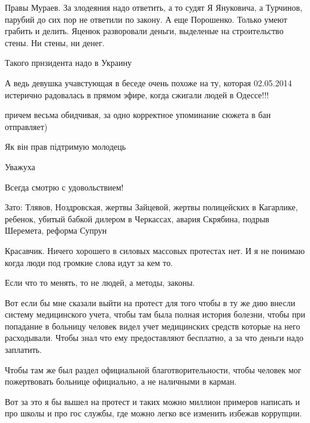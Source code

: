 \begin{itemize}
\begin{itemize}
\end{itemize} %


Правы Мураев. За злодеяния надо ответить, а то судят Я Януковича, а Турчинов,
парубий до сих пор не ответили по закону. А еще Порошенко. Только умеют грабить
и делить. Яценюк разворовали деньги, выделеные на строительство стены. Ни
стены, ни денег.


Такого прнзидента надо в Украину


А ведь девушка учавстующая в беседе очень похоже на ту, которая 02.05.2014
истерично радовалась в прямом эфире, когда сжигали людей в Одессе!!!

\begin{itemize} %
причем весьма обидчивая, за одно корректное упоминание сюжета в бан отправляет)
\end{itemize} %

Як він прав підтримую молодець

Уважуха

Всегда смотрю с удовольствием!


Зато: Тлявов, Ноздровская, жертвы Зайцевой, жертвы полицейских в Кагарлике,
ребенок, убитый бабкой дилером в Черкассах, авария Скрябина, подрыв Шеремета,
реформа Супрун



Красавчик. Ничего хорошего в силовых массовых протестах нет. И я не понимаю
когда люди под громкие слова идут за кем то.

Если что то менять, то не людей, а методы, законы.

Вот если бы мне сказали выйти на протест для того чтобы в ту же дию внесли
систему медицинского учета, чтобы там была полная история болезни, чтобы при
попадание в больницу человек видел учет медицинских средств которые на него
расходывали. Чтобы знал что ему предоставляют бесплатно, а за что деньги надо
заплатить.

Чтобы там же был раздел официальной благотворительности, чтобы человек мог
пожертвовать больнице официально, а не наличными в карман.

Вот за это я бы вышел на протест и таких можно миллион примеров написать и про
школы и про гос службы, где можно легко все изменить избежав коррупции.


\end{itemize}
